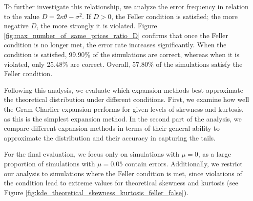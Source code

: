 To further investigate this relationship, we analyze the error frequency in relation to the value $D = 2\kappa\theta - \sigma^2$. If $D > 0$, the Feller condition is satisfied; the more negative $D$, the more strongly it is violated. Figure \ref{fig:max_number_of_same_prices_ratio_D} confirms that once the Feller condition is no longer met, the error rate increases significantly. When the condition is satisfied, 99.90\% of the simulations are correct, whereas when it is violated, only 25.48\% are correct. Overall, 57.80\% of the simulations satisfy the Feller condition.

Following this analysis, we evaluate which expansion methods best approximate the theoretical distribution under different conditions. First, we examine how well the Gram-Charlier expansion performs for given levels of skewness and kurtosis, as this is the simplest expansion method. In the second part of the analysis, we compare different expansion methods in terms of their general ability to approximate the distribution and their accuracy in capturing the tails.

For the final evaluation, we focus only on simulations with $\mu=0$, as a large proportion of simulations with $\mu=0.05$ contain errors. Additionally, we restrict our analysis to simulations where the Feller condition is met, since violations of the condition lead to extreme values for theoretical skewness and kurtosis (see Figure \ref{fig:kde_theoretical_skewness_kurtosis_feller_false}).

